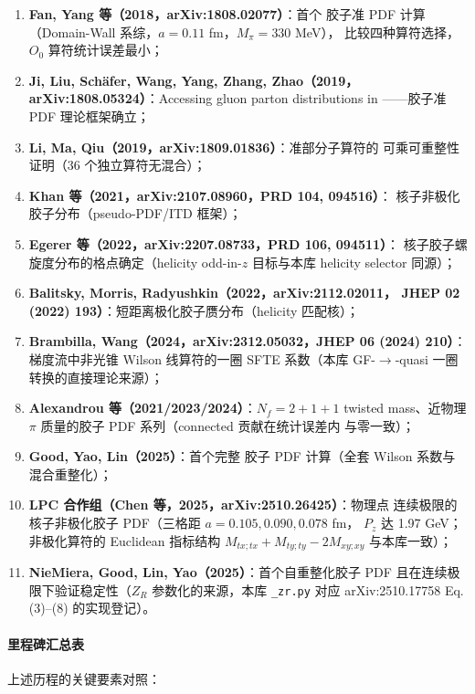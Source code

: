 \documentclass[11pt,a4paper]{ctexart}
\newcommand{\LaMET}{\text{LaMET}}
\newcommand{\code}[1]{\texttt{#1}}
\begin{document}
\begin{enumerate}
  \item \textbf{Fan, Yang 等（2018，arXiv:1808.02077）}：首个 \LaMET{}
  胶子准 PDF 计算（Domain-Wall 系综，$a=0.11$ fm，$M_\pi=330$ MeV），
  比较四种算符选择，$O_0$ 算符统计误差最小；
  \item \textbf{Ji, Liu, Sch\"afer, Wang, Yang, Zhang, Zhao（2019，
  arXiv:1808.05324）}：Accessing gluon parton distributions in
  \LaMET{}——胶子准 PDF 理论框架确立；
  \item \textbf{Li, Ma, Qiu（2019，arXiv:1809.01836）}：准部分子算符的
  可乘可重整性证明（36 个独立算符无混合）；
  \item \textbf{Khan 等（2021，arXiv:2107.08960，PRD 104, 094516）}：
  核子非极化胶子分布（pseudo-PDF/ITD 框架）；
  \item \textbf{Egerer 等（2022，arXiv:2207.08733，PRD 106, 094511）}：
  核子胶子螺旋度分布的格点确定（helicity odd-in-$z$ 目标与本库 helicity
  selector 同源）；
  \item \textbf{Balitsky, Morris, Radyushkin（2022，arXiv:2112.02011，
  JHEP 02 (2022) 193）}：短距离极化胶子赝分布（helicity 匹配核）；
  \item \textbf{Brambilla, Wang（2024，arXiv:2312.05032，JHEP 06 (2024)
  210）}：梯度流中非光锥 Wilson 线算符的一圈 SFTE 系数（本库
  GF-$\to$-quasi 一圈转换的直接理论来源）；
  \item \textbf{Alexandrou 等（2021/2023/2024）}：$N_f=2+1+1$ twisted
  mass、近物理 $\pi$ 质量的胶子 PDF 系列（connected 贡献在统计误差内
  与零一致）；
  \item \textbf{Good, Yao, Lin（2025）}：首个完整 \LaMET{} 胶子 PDF
  计算（全套 Wilson 系数与混合重整化）；
  \item \textbf{LPC 合作组（Chen 等，2025，arXiv:2510.26425）}：物理点
  连续极限的核子非极化胶子 PDF（三格距 $a=0.105,0.090,0.078$ fm，
  $P_z$ 达 1.97 GeV；非极化算符的 Euclidean 指标结构
  $M_{tx;tx}+M_{ty;ty}-2M_{xy;xy}$ 与本库一致）；
  \item \textbf{NieMiera, Good, Lin, Yao（2025）}：首个自重整化胶子 PDF
  且在连续极限下验证稳定性（$Z_R$ 参数化的来源，本库 \code{\_zr.py}
  对应 arXiv:2510.17758 Eq.(3)--(8) 的实现登记）。
\end{enumerate}

\paragraph{里程碑汇总表}上述历程的关键要素对照：
\end{document}
